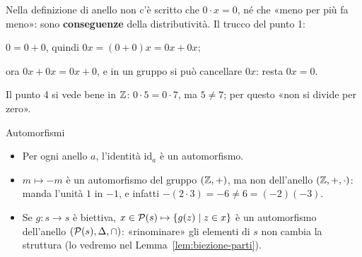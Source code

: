 \begin{spiegazione}
    Nella definizione di anello non c'è scritto che $0 \cdot x = 0$, né che «meno per più fa meno»: sono \textbf{conseguenze} della distributività. Il trucco del punto 1:
    \begin{passi}
        \item $0 = 0 + 0$, quindi $0x = (0 + 0)x = 0x + 0x$;
        \item ora $0x + 0x = 0x + 0$, e in un gruppo si può cancellare $0x$: resta $0x = 0$.
    \end{passi}
    Il punto 4 si vede bene in $\mathbb{Z}$: $0 \cdot 5 = 0 \cdot 7$, ma $5 \neq 7$; per questo «non si divide per zero».
\end{spiegazione}



\begin{esempio}{Automorfismi}
    \begin{itemize}
        \item Per ogni anello $a$, l'identità $\mathrm{id}_a$ è un automorfismo.
        \item $m \mapsto -m$ è un automorfismo del gruppo $(\mathbb{Z}, +)$, ma non dell'anello $(\mathbb{Z}, +, \cdot)$: manda l'unità $1$ in $-1$, e infatti
              $-(2 \cdot 3) = -6 \neq 6 = (-2)(-3)$.
        \item Se $g \colon s \to s$ è biettiva, $x \in \mathcal{P}(s) \mapsto \{g(z) \mid z \in x\}$ è un automorfismo dell'anello $(\mathcal{P}(s), \Delta, \cap)$: «rinominare» gli elementi
              di $s$ non cambia la struttura (lo vedremo nel Lemma~\ref{lem:biezione-parti}).
    \end{itemize}
\end{esempio}

